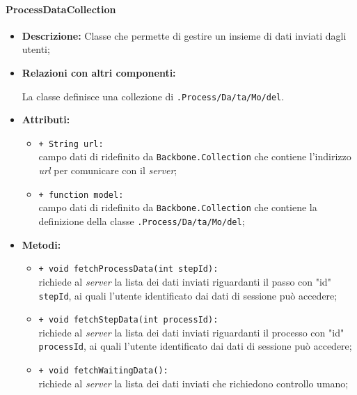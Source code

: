 \paragraph{ProcessDataCollection}
\label{processDataCollection}
\begin{flushleft}
\begin{itemize}
\item \textbf{Descrizione:} Classe che permette di gestire un insieme di dati inviati dagli utenti;
\item \textbf{Relazioni con altri componenti:}
\begin{sloppypar}
La classe definisce una collezione di \texttt{\model{}.Process\fshyp{}Da\fshyp{}ta\fshyp{}Mo\fshyp{}del}.
\end{sloppypar}
\item \textbf{Attributi:}
\begin{sloppypar}
\begin{itemize}
\item \texttt{+ String url:}\\ campo dati di ridefinito da \texttt{Backbone.Collection} che contiene l'indirizzo \textit{url} per comunicare con il \textit{server};
\item \texttt{+ function model:}\\ campo dati di ridefinito da \texttt{Backbone.Collection} che contiene la definizione della classe \texttt{\model{}.Process\fshyp{}Da\fshyp{}ta\fshyp{}Mo\fshyp{}del};
\end{itemize}
\end{sloppypar}
\item \textbf{Metodi:}
\begin{sloppypar}
\begin{itemize}
\item \texttt{+ void fetchProcessData(int stepId):}\\ richiede al \textit{server} la lista dei dati inviati riguardanti il passo con "id" \texttt{stepId}, ai quali l'utente identificato dai dati di sessione può accedere;
\item \texttt{+ void fetchStepData(int processId):}\\ richiede al \textit{server} la lista dei dati inviati riguardanti il processo con "id" \texttt{processId}, ai quali l'utente identificato dai dati di sessione può accedere;
\item \texttt{+ void fetchWaitingData():}\\ richiede al \textit{server} la lista dei dati inviati che richiedono controllo umano;

\end{itemize}
\end{sloppypar}
\end{itemize}
\end{flushleft}
